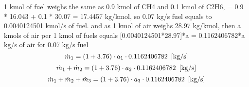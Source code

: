 \documentclass[10pt,fleqn]{article}
\begin{document}
\vspace{0.04in}
\noindent
\rm 1 kmol of fuel weighs the same as 0.9 kmol of CH4 and 0.1 kmol of C2H6, = 0.9 * 16.043 + 0.1 * 30.07 = 17.4457 kg/kmol, so 0.07 kg/s fuel equals to 0.0040124501 kmol/s of fuel.\newline
and as 1 kmol of air weighs 28.97 kg/kmol, then a kmols of air per 1 kmol of fuels equals [0.0040124501*28.97]*a = 0.1162406782*a kg/s of air for 0.07 kg/s fuel
\begin{equation}
\label{EES Eqn:27}
\dot {m}_{1} =  \left( 1 + 3.76 \right)  \cdot  a_{1} \cdot  0.1162406782   \   \left[ \rm kg/s \right] 
\end{equation}
\rm
\begin{equation}
\label{EES Eqn:28}
\dot {m}_{1} + \dot {m}_{2} =  \left( 1 + 3.76 \right)  \cdot  a_{2} \cdot  0.1162406782   \   \left[ \rm kg/s \right] 
\end{equation}
\rm
\begin{equation}
\label{EES Eqn:29}
\dot {m}_{1} + \dot {m}_{2} + \dot {m}_{3} =  \left( 1 + 3.76 \right)  \cdot  a_{3} \cdot  0.1162406782   \   \left[ \rm kg/s \right] 
\end{equation}
\rm
\end{document}
